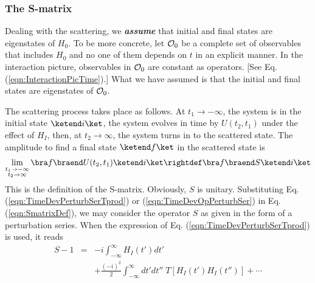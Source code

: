 \subsubsection{The S-matrix}
Dealing with the scattering, we {\bf \textit{assume}} that initial and final states are
eigenstates of $H_0$. To be more concrete, let ${\cal O}_0$ be a complete set of
observables that includes $H_0$ and no one of them depends on $t$ in an explicit manner.
In the interaction picture, observables in ${\cal O}_0$ are constant as operators. [See Eq.
(\ref{eqn:InteractionPicTime}).] What we have assumed is that the initial and final states
are eigenstates of ${\cal O}_0$.

The scattering process takes place as follows. At $t_1 \to -\infty$, the system is in the initial
state $\ketend i \ket$, the system evolves in time by $U(t_2, t_1)$ under the effect of
$H_I$, then, at $t_2 \to \infty$, the system turns in to the scattered state.
The amplitude to find a final state $\ketend f \ket$ in the scattered state is 
\begin{eqnarray}
\lim_{\stackrel{\scriptstyle t_1 \to -\infty}{t_2 \to \infty}}
\bra f \braend U(t_2, t_1) \ketend i \ket
\rightdef
\bra f \braend S \ketend i \ket
\label{eqn:SmatrixDef}
\end{eqnarray}
This is the definition of the S-matrix. Obviously, $S$ is unitary.
Substituting Eq. (\ref{eqn:TimeDevPerturbSerTprod}) or (\ref{eqn:TimeDevOpPerturbSer}) 
in Eq. (\ref{eqn:SmatrixDef}), we 
may consider the operator $S$ as given in the form of a perturbation series.
When the expression of Eq.  (\ref{eqn:TimeDevPerturbSerTprod}) is used, it reads
\begin{eqnarray}
 S -1 
&=&
 -i \int_{-\infty}^\infty H_I (t') dt'
\nonumber\\
&&+
\frac{(-i)^2}{2}
\int_{-\infty}^\infty dt'
 dt''
\;T[ H_I (t') H_I (t'')]
+ \cdots
\label{eqn:SmatrixPertSer}
\end{eqnarray}